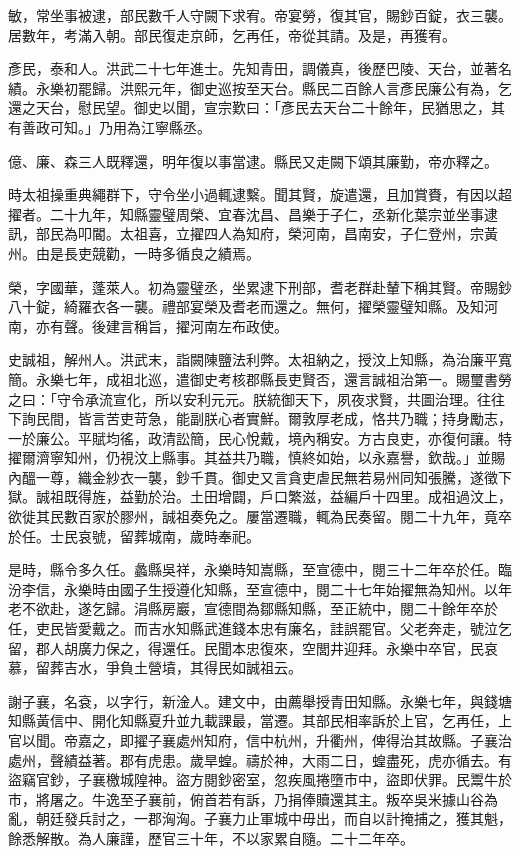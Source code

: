 \begin{pinyinscope}
敏，常坐事被逮，部民數千人守闕下求宥。帝宴勞，復其官，賜鈔百錠，衣三襲。居數年，考滿入朝。部民復走京師，乞再任，帝從其請。及是，再獲宥。

彥民，泰和人。洪武二十七年進士。先知青田，調儀真，後歷巴陵、天台，並著名績。永樂初罷歸。洪熙元年，御史巡按至天台。縣民二百餘人言彥民廉公有為，乞還之天台，慰民望。御史以聞，宣宗歎曰：「彥民去天台二十餘年，民猶思之，其有善政可知。」乃用為江寧縣丞。

億、廉、森三人既釋還，明年復以事當逮。縣民又走闕下頌其廉勤，帝亦釋之。

時太祖操重典繩群下，守令坐小過輒逮繫。聞其賢，旋遣還，且加賞賚，有因以超擢者。二十九年，知縣靈璧周榮、宜春沈昌、昌樂于子仁，丞新化葉宗並坐事逮訊，部民為叩閽。太祖喜，立擢四人為知府，榮河南，昌南安，子仁登州，宗黃州。由是長吏競勸，一時多循良之績焉。

榮，字國華，蓬萊人。初為靈璧丞，坐累逮下刑部，耆老群赴輦下稱其賢。帝賜鈔八十錠，綺羅衣各一襲。禮部宴榮及耆老而還之。無何，擢榮靈璧知縣。及知河南，亦有聲。後建言稱旨，擢河南左布政使。

史誠祖，解州人。洪武末，詣闕陳鹽法利弊。太祖納之，授汶上知縣，為治廉平寬簡。永樂七年，成祖北巡，遣御史考核郡縣長吏賢否，還言誠祖治第一。賜璽書勞之曰：「守令承流宣化，所以安利元元。朕統御天下，夙夜求賢，共圖治理。往往下詢民間，皆言苦吏苛急，能副朕心者實鮮。爾敦厚老成，恪共乃職；持身勵志，一於廉公。平賦均徭，政清訟簡，民心悅戴，境內稱安。方古良吏，亦復何讓。特擢爾濟寧知州，仍視汶上縣事。其益共乃職，慎終如始，以永嘉譽，欽哉。」並賜內醞一尊，織金紗衣一襲，鈔千貫。御史又言貪吏虐民無若易州同知張騰，遂徵下獄。誠祖既得旌，益勤於治。土田增闢，戶口繁滋，益編戶十四里。成祖過汶上，欲徙其民數百家於膠州，誠祖奏免之。屢當遷職，輒為民奏留。閱二十九年，竟卒於任。士民哀號，留葬城南，歲時奉祀。

是時，縣令多久任。蠡縣吳祥，永樂時知嵩縣，至宣德中，閱三十二年卒於任。臨汾李信，永樂時由國子生授遵化知縣，至宣德中，閱二十七年始擢無為知州。以年老不欲赴，遂乞歸。涓縣房巖，宣德間為鄒縣知縣，至正統中，閱二十餘年卒於任，吏民皆愛戴之。而吉水知縣武進錢本忠有廉名，詿誤罷官。父老奔走，號泣乞留，郡人胡廣力保之，得還任。民聞本忠復來，空閭井迎拜。永樂中卒官，民哀慕，留葬吉水，爭負土營墳，其得民如誠祖云。

謝子襄，名袞，以字行，新淦人。建文中，由薦舉授青田知縣。永樂七年，與錢塘知縣黃信中、開化知縣夏升並九載課最，當遷。其部民相率訴於上官，乞再任，上官以聞。帝嘉之，即擢子襄處州知府，信中杭州，升衢州，俾得治其故縣。子襄治處州，聲績益著。郡有虎患。歲旱蝗。禱於神，大雨二日，蝗盡死，虎亦循去。有盜竊官鈔，子襄檄城隍神。盜方閱鈔密室，忽疾風捲墮市中，盜即伏罪。民鬻牛於市，將屠之。牛逸至子襄前，俯首若有訴，乃捐俸贖還其主。叛卒吳米據山谷為亂，朝廷發兵討之，一郡洶洶。子襄力止軍城中毋出，而自以計掩捕之，獲其魁，餘悉解散。為人廉謹，歷官三十年，不以家累自隨。二十二年卒。


\end{pinyinscope}
